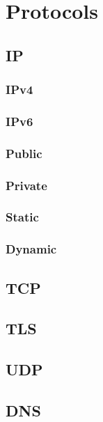 \chapter{Protocols}%

\section{IP}

\subsection{IPv4}

\subsection{IPv6}

\subsection{Public}

\subsection{Private}

\subsection{Static}

\subsection{Dynamic}

\section{TCP}

\section{TLS}

\section{UDP}

\section{DNS}

